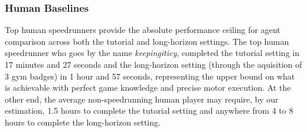 \subsubsection{Human Baselines}\label{sec:human_baselines}

Top human speedrunners provide the absolute performance ceiling for agent comparison across both the tutorial and long-horizon settings. The top human speedrunner who goes by the name \textit{keepingiticy}, completed the tutorial setting in 17 minutes and 27 seconds and the long-horizon setting (through the aquisition of 3 gym badges) in 1 hour and 57 seconds, representing the upper bound on what is achievable with perfect game knowledge and precise motor execution. At the other end, the average non-speedrunning human player may require, by our estimation, 1.5 hours to complete the tutorial setting and anywhere from 4 to 8 hours to complete the long-horizon setting. 
